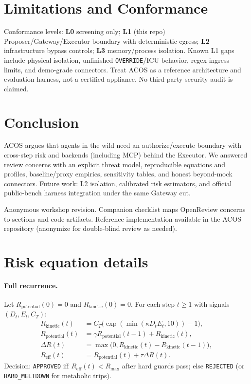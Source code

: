 \documentclass{article}
\begin{document}
\section{Limitations and Conformance}
\label{sec:limits}

Conformance levels: \textbf{L0} screening only; \textbf{L1} (this repo)
Proposer/Gateway/Executor boundary with deterministic egress;
\textbf{L2} infrastructure bypass controls; \textbf{L3} memory/process
isolation. Known L1 gaps include physical isolation, unfinished
\texttt{OVERRIDE}/ICU behavior, regex ingress limits, and demo-grade
connectors. Treat ACOS as a reference architecture and evaluation harness,
not a certified appliance. No third-party security audit is claimed.

\section{Conclusion}
ACOS argues that agents in the wild need an authorize/execute boundary with
cross-step risk and backends (including MCP) behind the Executor. We answered
review concerns with an explicit threat model, reproducible equations and
profiles, baseline/proxy empirics, sensitivity tables, and honest beyond-mock
connectors. Future work: L2 isolation, calibrated risk estimators, and
official public-bench harness integration under the same Gateway cut.

\begin{ack}
Anonymous workshop revision. Companion checklist maps OpenReview concerns to
sections and code artifacts. Reference implementation available in the ACOS
repository (anonymize for double-blind review as needed).
\end{ack}




\appendix

\section{Risk equation details}
\label{app:risk}

\paragraph{Full recurrence.}
Let $R_{\mathrm{potential}}(0)=0$ and $R_{\mathrm{kinetic}}(0)=0$. For each
step $t\ge 1$ with signals $(D_t,E_t,C_T)$:
\begin{align}
R_{\mathrm{kinetic}}(t)
  &= C_T\bigl(\exp(\min(\kappa D_t E_t,10))-1\bigr),\\
R_{\mathrm{potential}}(t)
  &= \gamma R_{\mathrm{potential}}(t-1) + R_{\mathrm{kinetic}}(t),\\
\Delta R(t)
  &= \max\bigl(0, R_{\mathrm{kinetic}}(t)-R_{\mathrm{kinetic}}(t-1)\bigr),\\
R_{\mathrm{eff}}(t)
  &= R_{\mathrm{potential}}(t) + \tau\Delta R(t).
\end{align}
Decision: \texttt{APPROVED} iff $R_{\mathrm{eff}}(t)<R_{\max}$ after hard
guards pass; else \texttt{REJECTED} (or \texttt{HARD\_MELTDOWN} for metabolic
trips).
\end{document}
